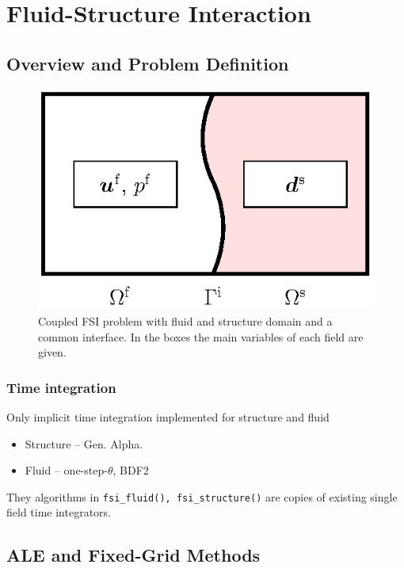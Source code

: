 \chapter{Fluid-Structure Interaction}

\section{Overview and Problem Definition}

\begin{figure}
\begin{center}
\includegraphics{fig/coupled_system_f_s}
\caption{Coupled FSI problem with fluid and structure domain and a common interface. In the boxes the main variables of each field are given.}
\end{center}
\end{figure}


\subsection{Time integration}

Only implicit time integration implemented for structure and fluid

\begin{itemize}
\item Structure -- Gen. Alpha.

\item Fluid -- one-step-\(\theta\), BDF2
\end{itemize}

They algorithms in \verb|fsi_fluid(), fsi_structure()| are copies of existing single field time integrators.

\section{ALE and Fixed-Grid Methods}

